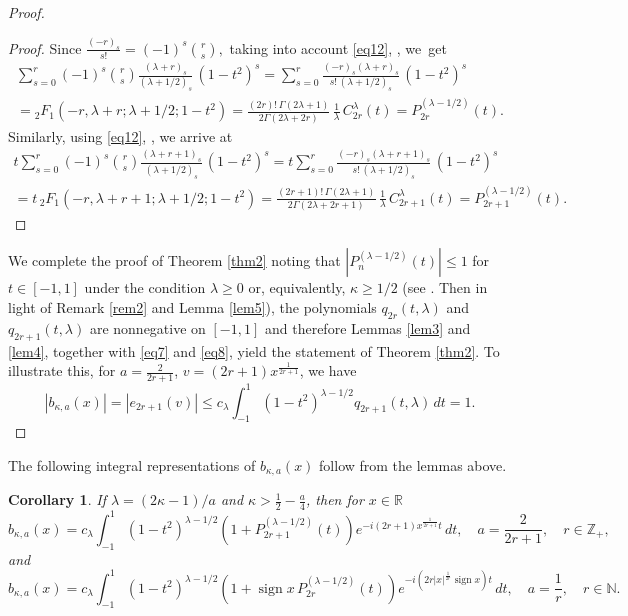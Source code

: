 \documentclass[12pt,twoside,reqno]{amsart}\usepackage[cp1251]{inputenc}
\theoremstyle{plain}
\newtheorem{corollary}[theorem]{Corollary}
\theoremstyle{remark}
\newcommand\sign{\operatorname{sign}}
\begin{document}
\begin{proof}
 \begin{proof}
Since
$%
\frac{(-r)_s}{s!}=(-1)^{s}\binom{r}{s},
 $ %
   taking into account  \eqref{eq12}, \cite[Chapt.~X, 10.9(21)]{BE53a}, we~get
\begin{multline*}
\sum_{s=0}^{r}(-1)^{s}\binom{r}{s}\frac{(\lambda+r)_{s}}{(\lambda+1/2)_{s}}\,(1-t^2)^s
=\sum_{s=0}^{r}\frac{(-r)_s(\lambda+r)_{s}}{s!\,(\lambda+1/2)_{s}}\,(1-t^2)^s\\
={}_{2}F_1(-r,\lambda+r;\lambda+1/2;1-t^2)=\frac{(2r)!\,\Gamma(2\lambda+1)}
{2\Gamma(2\lambda+2r)}\,\frac{1}{\lambda}\,C_{2r}^{\lambda}(t)=P_{2r}^{(\lambda-1/2)}(t).
\end{multline*}
Similarly, using \eqref{eq12}, \cite[Chapt. X, 10.9(22)]{BE53a}, we arrive at
\begin{multline*}
t\sum_{s=0}^{r}(-1)^{s}\binom{r}{s}\frac{(\lambda+r+1)_{s}}{(\lambda+1/2)_{s}}\,(1-t^2)^s
=t\sum_{s=0}^{r}\frac{(-r)_s(\lambda+r+1)_{s}}{s!\,(\lambda+1/2)_{s}}\,(1-t^2)^s\\
=t\,{}_{2}F_1(-r,\lambda+r+1;\lambda+1/2;1-t^2)=\frac{(2r+1)!\,\Gamma(2\lambda+1)}
{2\Gamma(2\lambda+2r+1)}\,\frac{1}{\lambda}\,C_{2r+1}^{\lambda}(t)=P_{2r+1}^{(\lambda-1/2)}(t).
\end{multline*}
 \end{proof}


We complete the proof of Theorem \ref{thm2} noting that
 $|P_{n}^{(\lambda-1/2)}(t)|\le 1$ for  $t\in [-1,1]$ under the condition  $\lambda\ge 0$ or, equivalently, $\kappa\ge 1/2$
(see \cite[Chapt.~VII, 7.32.2]{Se74}. Then in light of  Remark \ref{rem2} and Lemma \ref{lem5}),
 the polynomials  $q_{2r}(t,\lambda)$ and $q_{2r+1}(t,\lambda)$ are nonnegative on $[-1,1]$ and therefore Lemmas \ref{lem3} and \ref{lem4}, together with \eqref{eq7} and \eqref{eq8},
yield the statement of Theorem \ref{thm2}. To illustrate this, for $a=\frac{2}{2r+1}$, $v=(2r+1)x^{\frac{1}{2r+1}}$, we have
\[
|b_{\kappa,a}(x)|=|e_{2r+1}(v)|\le c_{\lambda}\int_{-1}^{1}(1-t^2)^{\lambda-1/2}q_{2r+1}(t,\lambda)\,dt%
=1.
\]
\end{proof}


The following integral representations of $b_{\kappa,a}(x)$ follow from the lemmas above.
\begin{corollary}\label{cor1} %
If $\lambda=(2\kappa-1)/a$ and
$\kappa>\frac{1}{2}-\frac{a}{4}$,  then for $x\in\mathbb{R}$
\[
b_{\kappa,a}(x)=c_{\lambda}\int_{-1}^{1}(1-t^2)^{\lambda-1/2}(1+P_{2r+1}^{(\lambda-1/2)}(t))e^{-i(2r+1)x^{\frac{1}{2r+1}}{}t}\,dt,\quad
a=\frac{2}{2r+1},\quad r\in\mathbb{Z}_+,
\]
and
\[
b_{\kappa,a}(x)=c_{\lambda}\int_{-1}^{1}(1-t^2)^{\lambda-1/2}(1+\sign x\,P_{2r}^{(\lambda-1/2)}(t))e^{-i(2r|x|^{\frac{1}{2r}}\sign x)t}\,dt,\quad
a=\frac{1}{r},\quad r\in\mathbb{N}.
\]
\end{corollary}
\end{document}
